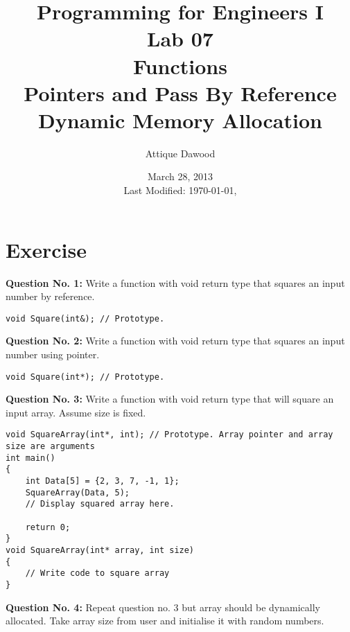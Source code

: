 \documentclass[12pt,a4paper]{article}
\title{\vspace{-1cm}Programming for Engineers I\\Lab 07\\Functions\\Pointers and Pass By Reference\\Dynamic Memory Allocation}
\author{Attique Dawood}
\date{March 28, 2013\\[0.2cm] Last Modified: \today, \currenttime}
\begin{document}
\maketitle
\section{Exercise}
\textbf{Question No. 1:} Write a function with void return type that squares an input number by reference.
\begin{lstlisting}[caption={Square by reference}]
void Square(int&); // Prototype.
\end{lstlisting}
\textbf{Question No. 2:} Write a function with void return type that squares an input number using pointer.
\begin{lstlisting}[caption={Square using pointer}]
void Square(int*); // Prototype.
\end{lstlisting}
\textbf{Question No. 3:} Write a function with void return type that will square an input array. Assume size is fixed.
\begin{lstlisting}[caption={Square using array pointer}]
void SquareArray(int*, int); // Prototype. Array pointer and array size are arguments
int main()
{
	int Data[5] = {2, 3, 7, -1, 1};
	SquareArray(Data, 5);
	// Display squared array here.

	return 0;
}
void SquareArray(int* array, int size)
{
	// Write code to square array
}
\end{lstlisting}
\textbf{Question No. 4:} Repeat question no. 3 but array should be dynamically allocated. Take array size from user and initialise it with random numbers.
\end{document}
